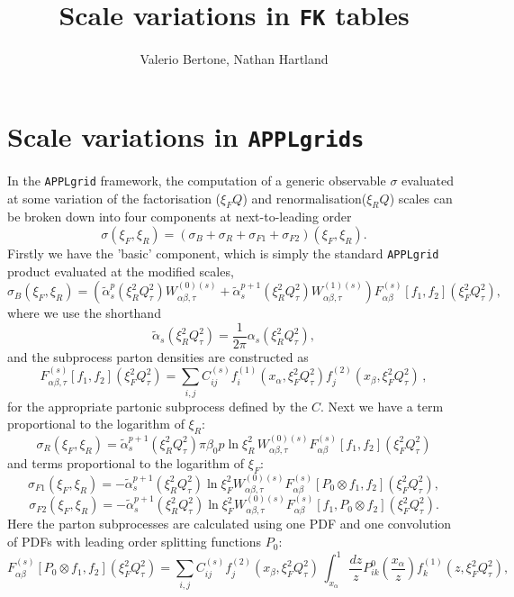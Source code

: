 \documentclass[11pt]{article}
\title{Scale variations in {\tt FK} tables}
\author{Valerio Bertone, Nathan Hartland}
\newcommand{\be}{\begin{equation}}
\newcommand{\ee}{\end{equation}}
\begin{document}
\maketitle
\section{Scale variations in {\tt APPLgrids}}
In the {\tt APPLgrid} framework, the computation of a generic observable $\sigma$ evaluated at some variation of the factorisation ($\xi_FQ$) and
renormalisation($\xi_RQ$) scales can be broken down into four components at next-to-leading order
\be \sigma(\xi_F, \xi_R) = \left( \sigma_B + \sigma_R + \sigma_{F1} + \sigma_{F2}\right)(\xi_F, \xi_R).\ee
Firstly we have the 'basic' component, which is simply the standard {\tt APPLgrid} product evaluated at the modified scales,
\be \sigma_B(\xi_F, \xi_R) =  \left(\tilde{\alpha}_s^{p}(\xi_R^2Q^2_\tau) 
     W_{\alpha\beta,\tau}^{(0)(s)}+ \tilde{\alpha}_s^{p+1}(\xi_R^2Q^2_\tau) W_{\alpha\beta,\tau}^{(1)(s)} \right)
     F^{(s)}_{\alpha\beta}\left[f_1, f_2\right]\left(\xi_F^2{Q^2_\tau}\right), \ee
where we use the shorthand
\be \tilde{\alpha}_s(\xi_R^2Q^2_\tau) =  \frac{1}{2\pi}\alpha_s\left(\xi_R^2 {Q^2_\tau}\right), \ee
and the subprocess parton densities are constructed as
\be \label{eq:basicsubproc}
  F^{(s)}_{\alpha\beta,\tau}\left[f_1, f_2\right]\left(\xi_F^2{Q^2_\tau}\right) =\sum_{i,j} C^{(s)}_{ij} 
  f^{(1)}_i(x_{\alpha},\xi_F^2Q^2_\tau)f_j^{(2)}(x_{\beta},\xi_F^2Q^2_\tau)\,,
\ee
for the appropriate partonic subprocess defined by the $C$. Next we have a term proportional to the logarithm of $\xi_R$:
\be \sigma_R(\xi_F, \xi_R) = \tilde{\alpha}_s^{p+1}(\xi_R^2Q^2_\tau) 
      \pi  \beta_0 p \ln \xi_R^2
         \,
         W_{\alpha\beta,\tau}^{(0)(s)}
    F^{(s)}_{\alpha\beta}\left[f_1, f_2\right]\left(\xi_F^2{Q^2_\tau}\right)  \ee
and terms proportional to the logarithm of $\xi_F$:
\be \sigma_{F1}(\xi_F, \xi_R) =-\tilde{\alpha}_s^{p+1}(\xi_R^2Q^2_\tau)
\ln \xi_F^2  W_{\alpha\beta,\tau}^{(0)(s)}
F^{(s)}_{\alpha\beta}[P_0\otimes f_1, f_2](\xi_F^2{Q^2_\tau}),
\ee
\be \sigma_{F2}(\xi_F, \xi_R) =-\tilde{\alpha}_s^{p+1}(\xi_R^2Q^2_\tau)
\ln \xi_F^2  W_{\alpha\beta,\tau}^{(0)(s)}
F^{(s)}_{\alpha\beta}[f_1, P_0\otimes f_2](\xi_F^2{Q^2_\tau}).
\ee
Here the parton subprocesses are calculated using one PDF and one convolution of PDFs with leading order splitting functions $P_0$:
\be \label{eq:convsubprocess1} F^{(s)}_{\alpha\beta}[P_0\otimes f_1, f_2](\xi_F^2{Q^2_\tau})=\sum_{i,j} C^{(s)}_{ij} 
 f_j^{(2)}(x_{\beta},\xi_F^2Q^2_\tau)\,  \int_{x_\alpha}^1 \frac{dz}{z}P^0_{ik}\left(\frac{x_\alpha}{z}\right)f^{(1)}_k(z,\xi_F^2Q^2_\tau), \ee
\end{document}
